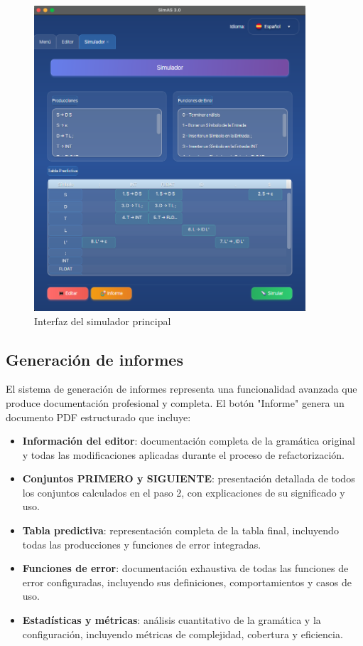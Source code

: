 \needspace{8cm}
\begin{figure}[H]
    \centering
    \includegraphics[width=0.9\textwidth]{figuras/simulador/simulador.png}
    \caption{Interfaz del simulador principal}
    \label{fig:simulador_principal}
\end{figure}

\subsection{Generación de informes}

El sistema de generación de informes representa una funcionalidad avanzada que produce documentación profesional y completa. El botón \string"Informe\string" genera un documento PDF estructurado que incluye:

\begin{itemize}
    \item \textbf{Información del editor}: documentación completa de la gramática original y todas las modificaciones aplicadas durante el proceso de refactorización.
    \item \textbf{Conjuntos PRIMERO y SIGUIENTE}: presentación detallada de todos los conjuntos calculados en el paso 2, con explicaciones de su significado y uso.
    \item \textbf{Tabla predictiva}: representación completa de la tabla final, incluyendo todas las producciones y funciones de error integradas.
    \item \textbf{Funciones de error}: documentación exhaustiva de todas las funciones de error configuradas, incluyendo sus definiciones, comportamientos y casos de uso.
    \item \textbf{Estadísticas y métricas}: análisis cuantitativo de la gramática y la configuración, incluyendo métricas de complejidad, cobertura y eficiencia.
\end{itemize}

